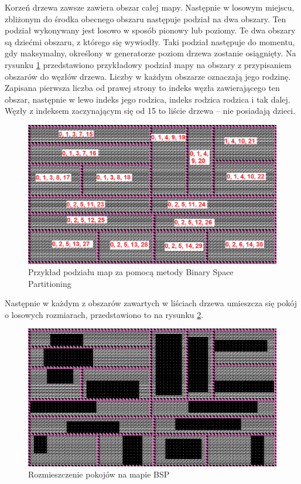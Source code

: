 \documentclass[12pt,twoside]{article}
\begin{document}
Korzeń drzewa zawsze zawiera obszar całej mapy. Następnie w losowym miejscu, zbliżonym do środka obecnego obszaru następuje podział na dwa obszary. Ten podział wykonywany jest losowo w sposób pionowy lub poziomy. Te dwa obszary są dziećmi obszaru, z którego się wywiodły. Taki podział następuje do momentu, gdy maksymalny, określony w generatorze poziom drzewa zostanie osiągnięty. Na rysunku \ref{generators:bsp_tree} przedstawiono przykładowy podział mapy na obszary z przypisaniem obszarów do węzłów drzewa. Liczby w każdym obszarze oznaczają jego rodzinę. Zapisana pierwsza liczba od prawej strony to indeks węzła zawierającego ten obszar, następnie w lewo indeks jego rodzica, indeks rodzica rodzica i tak dalej. Węzły z indeksem zaczynającym się od 15 to liście drzewa -- nie posiadają dzieci.

\FloatBarrier
\begin{figure}[ht]
	\centering
	\includegraphics[width=14cm]{images/generators/bsp_tree.png}
	\caption{Przykład podziału map za pomocą metody Binary Space Partitioning}
	\label{generators:bsp_tree}
\end{figure}
\FloatBarrier

Następnie w każdym z obszarów zawartych w liściach drzewa umieszcza się pokój o losowych rozmiarach, przedstawiono to na rysunku \ref{generators:bsp_rooms}.

\FloatBarrier
\begin{figure}[ht]
	\centering
	\includegraphics[width=12cm]{images/generators/bsp_rooms.png}
	\caption{Rozmieszczenie pokojów na mapie BSP}
	\label{generators:bsp_rooms}
\end{figure}
\FloatBarrier
\end{document}
